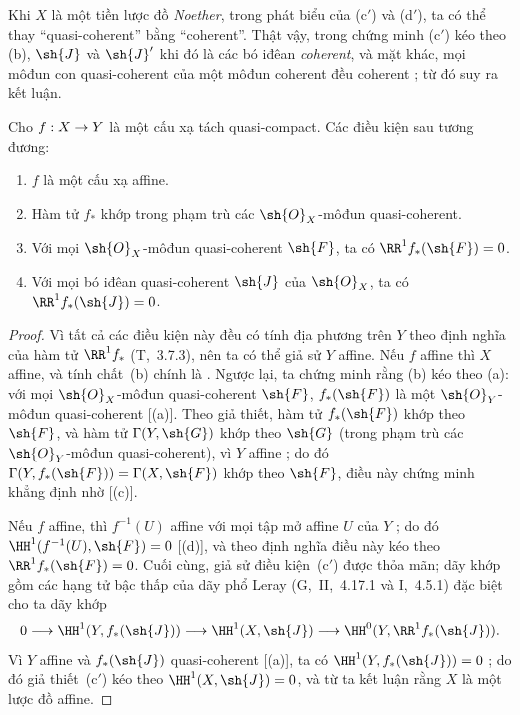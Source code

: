 \documentclass[oneside,10pt]{amsart}
\makeatletter
\newcommand{\ega@arrow}[2]{\mathchoice{#1}{#2}{#2}{#2}}
\renewcommand{\to}{\ega@arrow{\longrightarrow}{\rightarrow}}
\let\EGAOriginalLabel\label
\renewcommand{\label}[1]{\phantomsection\EGAOriginalLabel{#1}}
\makeatother
\begin{document}
\begin{remark}[5.2.1.1]
\label{II.5.2.1.1}
Khi $X$ là một tiền lược đồ \emph{Noether}, trong phát biểu của (c$'$) và (d$'$), ta có thể thay ``quasi-coherent'' bằng ``coherent''.
Thật vậy, trong chứng minh (c$'$) kéo theo (b), $\sh{J}$ và $\sh{J}'$ khi đó là các bó iđêan \emph{coherent}, và mặt khác, mọi môđun con quasi-coherent của một môđun coherent đều coherent ;
từ đó suy ra kết luận.
\end{remark}

\begin{corollary}[5.2.2]
\label{II.5.2.2}
Cho $f:X\to Y$ là một cấu xạ tách quasi-compact.
Các điều kiện sau tương đương:
\begin{enumerate}
  \item[{\rm(a)}] $f$ là một cấu xạ affine.
  \item[{\rm(b)}] Hàm tử $f_*$ khớp trong phạm trù các $\sh{O}_X$-môđun quasi-coherent.
  \item[{\rm(c)}] Với mọi $\sh{O}_X$-môđun quasi-coherent $\sh{F}$, ta có $\RR^1f_*(\sh{F})=0$.
  \item[{\rm(c')}] Với mọi bó iđêan quasi-coherent $\sh{J}$ của $\sh{O}_X$, ta có $\RR^1f_*(\sh{J})=0$.
\end{enumerate}
\end{corollary}

\begin{proof}
Vì tất cả các điều kiện này đều có tính địa phương trên $Y$ theo định nghĩa của hàm tử $\RR^1f_*$ (T,~3.7.3), nên ta có thể giả sử $Y$ affine.
Nếu $f$ affine thì $X$ affine, và tính chất~(b) chính là .
Ngược lại, ta chứng minh rằng (b) kéo theo (a):
với mọi $\sh{O}_X$-môđun quasi-coherent $\sh{F}$, $f_*(\sh{F})$ là một $\sh{O}_Y$-môđun quasi-coherent [(a)].
Theo giả thiết, hàm tử $f_*(\sh{F})$ khớp theo $\sh{F}$, và hàm tử $\Gamma(Y,\sh{G})$ khớp theo $\sh{G}$ (trong phạm trù các $\sh{O}_Y$-môđun quasi-coherent), vì $Y$ affine ;
do đó $\Gamma(Y,f_*(\sh{F}))=\Gamma(X,\sh{F})$ khớp theo $\sh{F}$, điều này chứng minh khẳng định nhờ [(c)].

Nếu $f$ affine, thì $f^{-1}(U)$ affine với mọi tập mở affine $U$ của $Y$ ; do đó $\HH^1(f^{-1}(U),\sh{F})=0$ [(d)], và theo định nghĩa điều này kéo theo $\RR^1f_*(\sh{F})=0$.
Cuối cùng, giả sử điều kiện~(c$'$) được thỏa mãn;
dãy khớp gồm các hạng tử bậc thấp của dãy phổ Leray (G,~II,~4.17.1 và I,~4.5.1) đặc biệt cho ta dãy khớp
\[
  0\to\HH^1(Y,f_*(\sh{J}))\to\HH^1(X,\sh{J})\to\HH^0(Y,\RR^1f_*(\sh{J})).
\]
Vì $Y$ affine và $f_*(\sh{J})$ quasi-coherent [(a)], ta có $\HH^1(Y,f_*(\sh{J}))=0$ ;
do đó giả thiết~(c$'$) kéo theo $\HH^1(X,\sh{J})=0$, và từ  ta kết luận rằng $X$ là một lược đồ affine.
\end{proof}
\end{document}
